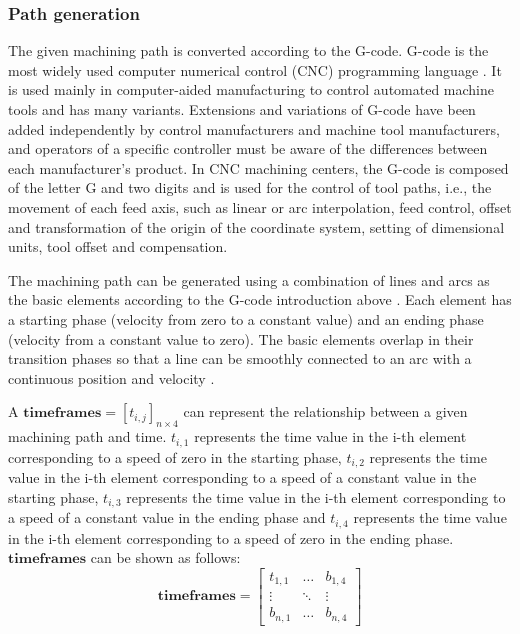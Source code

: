 \subsubsection{Path generation} \label{subsubsec:subsec:sec:scheme:process:path: path generation}
The given machining path is converted according to the G-code. G-code is the most widely used computer numerical control (CNC) programming language \cite{cncs}. It is used mainly in computer-aided manufacturing to control automated machine tools and has many variants. Extensions and variations of G-code have been added independently by control manufacturers and machine tool manufacturers, and operators of a specific controller must be aware of the differences between each manufacturer's product. In CNC machining centers, the G-code is composed of the letter G and two digits and is used for the control of tool paths, i.e., the movement of each feed axis, such as linear or arc interpolation, feed control, offset and transformation of the origin of the coordinate system, setting of dimensional units, tool offset and compensation. \par
The machining path can be generated using a combination of lines and arcs as the basic elements according to the G-code introduction above \cite{dqt}. Each element has a starting phase (velocity from zero to a constant value) and an ending phase (velocity from a constant value to zero). The basic elements overlap in their transition phases so that a line can be smoothly connected to an arc with a continuous position and velocity \cite{dqt}. \par
A $\boldsymbol{timeframes} = \left[t_{i,j}\right]_{n \times 4}$ can represent the relationship between a given machining path and time. $t_{i,1}$ represents the time value in the i-th element corresponding to a speed of zero in the starting phase, $t_{i,2}$ represents the time value in the i-th element corresponding to a speed of a constant value in the starting phase, $t_{i,3}$ represents the time value in the i-th element corresponding to a speed of a constant value in the ending phase and $t_{i,4}$ represents the time value in the i-th element corresponding to a speed of zero in the ending phase. $\boldsymbol{timeframes}$ can be shown as follows:
\begin{equation}
\boldsymbol{timeframes} = \begin{bmatrix} 
    t_{1,1} & \dots  & b_{1,4}\\
    \vdots & \ddots & \vdots\\
    b_{n,1} & \dots  & b_{n,4} 
    \end{bmatrix}
    \label{eq:tframe}
\end{equation}

